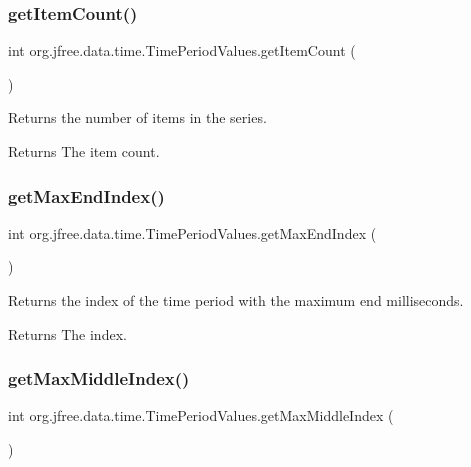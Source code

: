 \subsubsection{\texorpdfstring{get\+Item\+Count()}{getItemCount()}}
{\footnotesize\ttfamily int org.\+jfree.\+data.\+time.\+Time\+Period\+Values.\+get\+Item\+Count (\begin{DoxyParamCaption}{ }\end{DoxyParamCaption})}

Returns the number of items in the series.

\begin{DoxyReturn}{Returns}
The item count. 
\end{DoxyReturn}
\mbox{\label{classorg_1_1jfree_1_1data_1_1time_1_1_time_period_values_a32458e119c457b18c42daa124ca06fa9}} 
\subsubsection{\texorpdfstring{get\+Max\+End\+Index()}{getMaxEndIndex()}}
{\footnotesize\ttfamily int org.\+jfree.\+data.\+time.\+Time\+Period\+Values.\+get\+Max\+End\+Index (\begin{DoxyParamCaption}{ }\end{DoxyParamCaption})}

Returns the index of the time period with the maximum end milliseconds.

\begin{DoxyReturn}{Returns}
The index. 
\end{DoxyReturn}
\mbox{\label{classorg_1_1jfree_1_1data_1_1time_1_1_time_period_values_a2c17360a02e242be58d9238b5e482f68}} 
\subsubsection{\texorpdfstring{get\+Max\+Middle\+Index()}{getMaxMiddleIndex()}}
{\footnotesize\ttfamily int org.\+jfree.\+data.\+time.\+Time\+Period\+Values.\+get\+Max\+Middle\+Index (\begin{DoxyParamCaption}{ }\end{DoxyParamCaption})}

